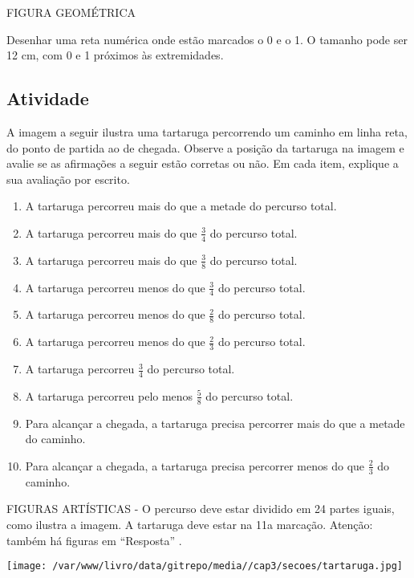 \documentclass[a4,12pt]{book}
\begin{document}
\begin{imagem*}[breakable]{}{}   FIGURA GEOMÉTRICA  
  
  Desenhar uma reta numérica onde estão marcados o 0 e o 1. O tamanho pode ser 12 cm, com 0 e 1 próximos às extremidades.  
\end{imagem*}

\subsection{Atividade}

A imagem a seguir ilustra uma tartaruga percorrendo um caminho em linha reta, do ponto de partida ao de chegada. Observe a posição da tartaruga na imagem e avalie se as afirmações a seguir estão corretas ou não. Em cada item, explique a sua avaliação por escrito.
\begin{enumerate} [\quad a)] %
  \item     A tartaruga percorreu mais do que a metade do percurso total.
  \item     A tartaruga percorreu mais do que     $\frac{3}{4}$     do percurso total.
  \item     A tartaruga percorreu mais do que     $\frac{3}{8}$     do percurso total.
  \item     A tartaruga percorreu menos do que     $\frac{3}{4}$     do percurso total.
  \item     A tartaruga percorreu menos do que     $\frac{2}{8}$     do percurso total.
  \item     A tartaruga percorreu menos do que     $\frac{2}{3}$     do percurso total.
  \item     A tartaruga percorreu     $\frac{3}{4}$     do percurso total.
  \item     A tartaruga percorreu pelo menos     $\frac{5}{8}$     do percurso total.
  \item     Para alcançar a chegada, a tartaruga precisa percorrer mais do que a metade do caminho.
  \item     Para alcançar a chegada, a tartaruga precisa percorrer menos do que     $\frac{2}{3}$     do caminho.
\end{enumerate} %


\begin{imagem*}[breakable]{}{}   FIGURAS ARTÍSTICAS - O percurso deve estar dividido em 24 partes iguais, como ilustra a imagem. A tartaruga deve estar na 11a marcação. Atenção: também há figuras em   ``Resposta''  .  
  
    \texttt{[image: /var/www/livro/data/gitrepo/media//cap3/secoes/tartaruga.jpg]}  
\end{imagem*}
\end{document}
